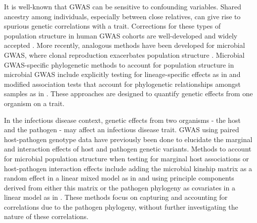 \documentclass[11pt]{article}
\begin{document}
\begin{linenumbers}
It is well-known that GWAS can be sensitive to confounding variables. Shared ancestry among individuals, especially between close relatives, can give rise to spurious genetic correlations with a trait. Corrections for these types of population structure in human GWAS cohorts are well-developed and widely accepted  \citep{Astle2009, Price2006}. More recently, analogous methods have been developed for microbial GWAS, where clonal reproduction exacerbates population structure \citep{Power2017}. Microbial GWAS-specific phylogenetic methods to account for population structure in microbial GWAS include explicitly testing for lineage-specific effects as in \citep{Earle2016} and modified association tests that account for phylogenetic relationships amongst samples as in \citep{collins_phylogenetic_nodate}. 
These approaches are designed to quantify genetic effects from one organism on a trait. 

In the infectious disease context, genetic effects from two organisms - the host and the pathogen - may affect an infectious disease trait. GWAS using paired host-pathogen genotype data have previously been done to elucidate the marginal and interaction effects of host and pathogen genetic variants. Methods to account for microbial population structure when testing for marginal host associations or host-pathogen interaction effects include adding the microbial kinship matrix as a random effect in a linear mixed model as in \citep{Wang2018Two-wayGenomes} and using principle components derived from either this matrix or the pathogen phylogeny as covariates in a linear model as in \citep{Naret2018}. These methods focus on capturing and accounting for correlations due to the pathogen phylogeny, without further investigating the nature of these correlations.


\end{linenumbers}
\end{document}
